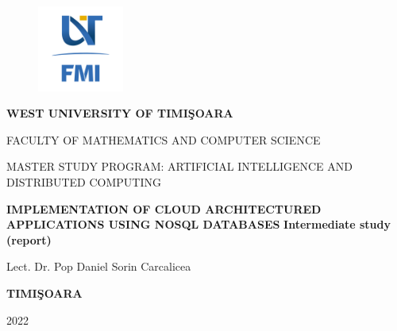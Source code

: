 \documentclass[12pt,a4paper,oneside]{book}
\theoremstyle{definition}
\theoremstyle{remark}
\begin{document}
\sloppy
\thispagestyle{empty}
\begin{center}
\begin{figure}[h!]
\vspace{-20pt}
\begin{center}
\includegraphics[width=80pt]{FMI-03.png}
\end{center}
\end{figure}


{\large{\bf WEST UNIVERSITY OF TIMI\c SOARA

FACULTY OF MATHEMATICS AND COMPUTER SCIENCE

MASTER STUDY PROGRAM: ARTIFICIAL INTELLIGENCE AND DISTRIBUTED COMPUTING}}

\vspace{120pt}
{\huge {\bf IMPLEMENTATION OF CLOUD ARCHITECTURED APPLICATIONS USING NOSQL DATABASES}}
\newline \newline \newline
{\huge {\bf  Intermediate study (report)}}

\vspace{160pt}
\end{center}

{\large{}

\noindent Lect. Dr. Pop Daniel\hfill 
\noindent Sorin Carcalicea}

\vfill
\begin{center}
{\bf TIMI\c SOARA

2022}
\end{center}

\tableofcontents
\listoffigures






\cleardoublepage
{}


\end{document}
